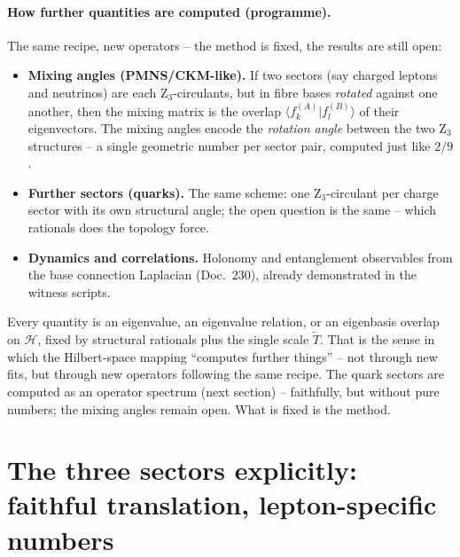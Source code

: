\paragraph{How further quantities are computed (programme).}
The same recipe, new operators -- the method is fixed, the results are still
open:
\begin{itemize}
  \item \textbf{Mixing angles (PMNS/CKM-like).} If two sectors (say charged
        leptons and neutrinos) are each Z$_3$-circulants, but in fibre bases
        \emph{rotated} against one another, then the mixing matrix is the
        overlap $\langle f_k^{(A)}|f_l^{(B)}\rangle$ of their eigenvectors. The
        mixing angles encode the \emph{rotation angle} between the two Z$_3$
        structures -- a single geometric number per sector pair, computed just
        like $2/9$.
  \item \textbf{Further sectors (quarks).} The same scheme: one Z$_3$-circulant
        per charge sector with its own structural angle; the open question is
        the same -- which rationals does the topology force.
  \item \textbf{Dynamics and correlations.} Holonomy and entanglement
        observables from the base connection Laplacian (Doc.~230), already
        demonstrated in the witness scripts.
\end{itemize}

\begin{important}
Every quantity is an eigenvalue, an eigenvalue relation, or an eigenbasis
overlap on $\mathcal{H}$, fixed by structural rationals plus the single scale
$\tilde T$. That is the sense in which the Hilbert-space mapping
\enquote{computes further things} -- not through new fits, but through new
operators following the same recipe. The quark sectors are computed as an
operator spectrum (next section) -- faithfully, but without pure numbers; the
mixing angles remain open. What is fixed is the method.
\end{important}

\section{The three sectors explicitly: faithful translation, lepton-specific numbers}

